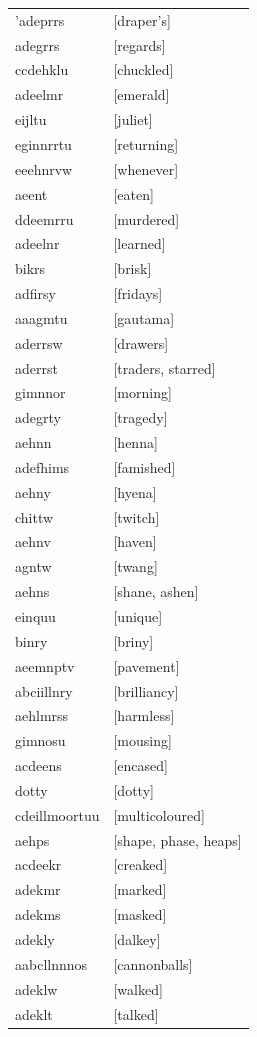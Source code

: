 \documentclass{article}
\begin{document}
\begin{tabular}{ll}
'adeprrs & [draper's] \\
adegrrs & [regards] \\
ccdehklu & [chuckled] \\
adeelmr & [emerald] \\
eijltu & [juliet] \\
eginnrrtu & [returning] \\
eeehnrvw & [whenever] \\
aeent & [eaten] \\
ddeemrru & [murdered] \\
adeelnr & [learned] \\
bikrs & [brisk] \\
adfirsy & [fridays] \\
aaagmtu & [gautama] \\
aderrsw & [drawers] \\
aderrst & [traders, starred] \\
gimnnor & [morning] \\
adegrty & [tragedy] \\
aehnn & [henna] \\
adefhims & [famished] \\
aehny & [hyena] \\
chittw & [twitch] \\
aehnv & [haven] \\
agntw & [twang] \\
aehns & [shane, ashen] \\
einquu & [unique] \\
binry & [briny] \\
aeemnptv & [pavement] \\
abciillnry & [brilliancy] \\
aehlmrss & [harmless] \\
gimnosu & [mousing] \\
acdeens & [encased] \\
dotty & [dotty] \\
cdeillmoortuu & [multicoloured] \\
aehps & [shape, phase, heaps] \\
acdeekr & [creaked] \\
adekmr & [marked] \\
adekms & [masked] \\
adekly & [dalkey] \\
aabcllnnnos & [cannonballs] \\
adeklw & [walked] \\
adeklt & [talked] \\

\end{tabular}
\end{document}
